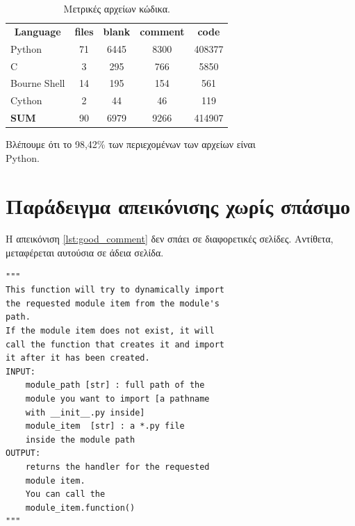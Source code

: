 \documentclass[12pt,a4paper]{report}%
\begin{document}
\begin{table}[!htbp]
\centering
\caption{Μετρικές αρχείων κώδικα.}
\label{tbl:code_files_metrics}
\begin{tabular}{|l|cccc|}
\hline
\multicolumn{1}{|c|}{\textbf{Language}} & \textbf{files} & \textbf{blank} & \textbf{comment} & \textbf{code} \\
Python                                  & 71             & 6445           & 8300             & 408377        \\
C                                       & 3              & 295            & 766              & 5850          \\
Bourne Shell                            & 14             & 195            & 154              & 561           \\
Cython                                  & 2              & 44             & 46               & 119           \\ \hline
\textbf{SUM}                            & 90             & 6979           & 9266             & 414907        \\ \hline
\end{tabular}
\end{table}

Βλέπουμε ότι το 98,42\% των περιεχομένων των αρχείων είναι\\
Python.

\section{Παράδειγμα απεικόνισης χωρίς σπάσιμο}
Η απεικόνιση \ref{lst:good_comment} δεν σπάει σε διαφορετικές σελίδες.
Αντίθετα, μεταφέρεται αυτούσια σε άδεια σελίδα.

\noindent\begin{minipage}{\linewidth}
\begin{lstlisting}[label=lst:good_comment,
caption=Διατήρηση απεικόνισης στην ίδια σελίδα.]
"""
This function will try to dynamically import
the requested module item from the module's
path.
If the module item does not exist, it will
call the function that creates it and import
it after it has been created.
INPUT:
    module_path [str] : full path of the
    module you want to import [a pathname
    with __init__.py inside]
    module_item  [str] : a *.py file
    inside the module path
OUTPUT:
    returns the handler for the requested
    module item.
    You can call the
    module_item.function()
"""
\end{lstlisting}
\end{minipage}




{\footnotesize
}
\end{document}
